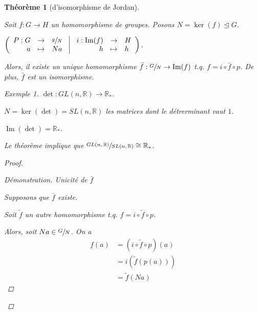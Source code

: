 \documentclass{report}
\newcommand*{\reels}{\mathbb{R}}
\newcommand*{\image}{\operatorname{Im}}
\newtheorem*{thm}{Th\'eor\`eme}
\theoremstyle{definition}
\theoremstyle{remark}
\newtheorem*{exem}{Exemple}
\newenvironment*{subproof}[1][D\'emonstration]
{
\begin{proof}[#1]

}
{
	\renewcommand{\qedsymbol}{$\blacksquare$}
\end{proof}
\renewcommand{\qedsymbol}{$\square$}
}
\begin{document}
	\begin{thm}[d'isomorphisme de Jordan]~

		Soit $f:G \to H$ un homomorphisme de groupes. Posons $N = \ker(f) \trianglelefteq G$.
		\begin{center}
		\end{center}

		$\left(\begin{array}{rcl}
			P:G&\to&\sfrac{g}{N}\\
			a&\mapsto&Na
		\end{array} ~\middle|~ \begin{array}{rcl}
			i:\image(f)&\to&H\\
			h&\mapsto&h
		\end{array}\right)$.

		Alors, il existe un unique homomorphisme $\bar{f}:\sfrac{G}{N} \to \image(f)$ t.q. $f=i \circ \bar{f} \circ p$. De plus, $\bar{f}$ est un isomorphisme.
		\begin{exem}
			$\det:GL(n,\reels) \to \reels_*$.

			$N = \ker(\det) = SL(n,\reels)$ les matrices dont le d\'etrerminant vaut $1$.

			$\image(\det) = \reels_*$.

			Le th\'eor\`eme implique que $\sfrac{GL(n,\reels)}{SL(n,\reels)} \cong \reels_*$.
		\end{exem}
		\begin{proof}~

			\begin{subproof}{Unicit\'e de $\bar{f}$}~

				Supposons que $\bar{f}$ existe.

				Soit $\tilde{f}$ un autre homomorphisme t.q. $f=i \circ \tilde{f} \circ p$.

				Alors, soit $Na \in \sfrac{G}{N}$. On a
				\begin{align*}
					f(a)&= \left(i \circ \tilde{f} \circ p\right)(a)\\
					&= i(\tilde{f}(p(a)))\\
					&= \tilde{f}(Na)
				\end{align*}


\end{subproof}
\end{proof}
\end{thm}
\end{document}
